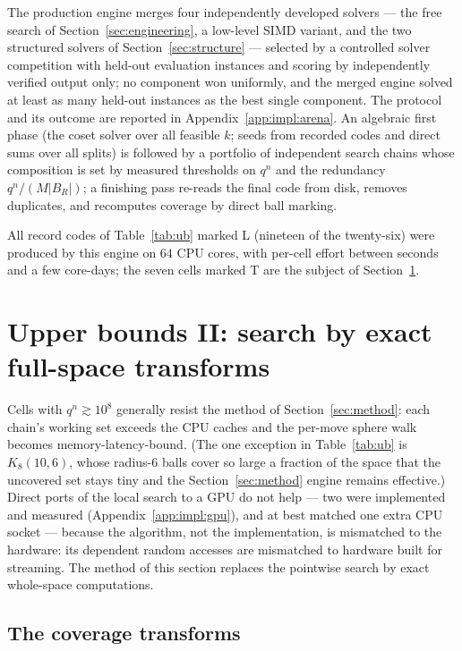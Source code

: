 \documentclass[11pt]{amsart}
\newcommand{\Kq}[3]{K_{#1}(#2,#3)}
\begin{document}
The production engine merges four independently developed solvers --- the
free search of Section~\ref{sec:engineering}, a low-level SIMD variant,
and the two structured solvers of Section~\ref{sec:structure} --- selected
by a controlled solver competition with held-out evaluation instances and
scoring by independently verified output only; no component won uniformly,
and the merged engine solved at least as many held-out instances as the
best single component. The protocol and its outcome are reported in
Appendix~\ref{app:impl:arena}. An algebraic first phase (the coset solver
over all feasible $k$; seeds from recorded codes and direct sums over all
splits) is followed by a portfolio of independent search chains whose
composition is set by measured thresholds on $q^n$ and the redundancy
$q^n/(M|B_R|)$; a finishing pass re-reads the final code from disk, removes
duplicates, and recomputes coverage by direct ball marking.

All record codes of Table~\ref{tab:ub} marked L (nineteen of the
twenty-six) were produced by this engine on $64$ CPU cores, with per-cell
effort between seconds and a few core-days; the seven cells marked T are
the subject of Section~\ref{sec:gpu}.

\section{Upper bounds II: search by exact full-space
transforms}\label{sec:gpu}

Cells with $q^n\gtrsim 10^8$ generally resist the method of
Section~\ref{sec:method}: each chain's working set exceeds the CPU caches
and the per-move sphere walk becomes memory-latency-bound. (The one
exception in Table~\ref{tab:ub} is $\Kq{8}{10}{6}$, whose radius-$6$
balls cover so large a fraction of the space that the uncovered set stays
tiny and the Section~\ref{sec:method} engine remains effective.) Direct ports of
the local search to a GPU do not help --- two were implemented and measured
(Appendix~\ref{app:impl:gpu}), and at best matched one extra CPU socket ---
because the algorithm, not the implementation, is mismatched to the
hardware: its dependent random accesses are mismatched to hardware built
for streaming. The method of this section replaces the pointwise search by
exact whole-space computations.

\subsection{The coverage transforms}
\end{document}
